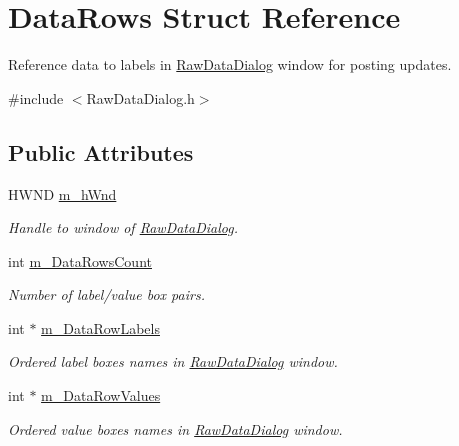 \hypertarget{struct_data_rows}{
\section{DataRows Struct Reference}
\label{struct_data_rows}
}


Reference data to labels in \hyperlink{class_raw_data_dialog}{RawDataDialog} window for posting updates.  




{\ttfamily \#include $<$RawDataDialog.h$>$}

\subsection*{Public Attributes}
\begin{DoxyCompactItemize}
\item 
\hypertarget{struct_data_rows_af3948dda47ada8528db37f5f97d0fd07}{
HWND \hyperlink{struct_data_rows_af3948dda47ada8528db37f5f97d0fd07}{m\_\-hWnd}}
\label{struct_data_rows_af3948dda47ada8528db37f5f97d0fd07}

\begin{DoxyCompactList}\small\item\em Handle to window of \hyperlink{class_raw_data_dialog}{RawDataDialog}. \end{DoxyCompactList}\item 
\hypertarget{struct_data_rows_a792b724c0572db986a6667b360a6676b}{
int \hyperlink{struct_data_rows_a792b724c0572db986a6667b360a6676b}{m\_\-DataRowsCount}}
\label{struct_data_rows_a792b724c0572db986a6667b360a6676b}

\begin{DoxyCompactList}\small\item\em Number of label/value box pairs. \end{DoxyCompactList}\item 
\hypertarget{struct_data_rows_ac5ce457a98f617913ad26bc9aed3de68}{
int $\ast$ \hyperlink{struct_data_rows_ac5ce457a98f617913ad26bc9aed3de68}{m\_\-DataRowLabels}}
\label{struct_data_rows_ac5ce457a98f617913ad26bc9aed3de68}

\begin{DoxyCompactList}\small\item\em Ordered label boxes names in \hyperlink{class_raw_data_dialog}{RawDataDialog} window. \end{DoxyCompactList}\item 
\hypertarget{struct_data_rows_a75d87af9a4cffed8ab995a909ed09088}{
int $\ast$ \hyperlink{struct_data_rows_a75d87af9a4cffed8ab995a909ed09088}{m\_\-DataRowValues}}
\label{struct_data_rows_a75d87af9a4cffed8ab995a909ed09088}

\begin{DoxyCompactList}\small\item\em Ordered value boxes names in \hyperlink{class_raw_data_dialog}{RawDataDialog} window. \end{DoxyCompactList}\end{DoxyCompactItemize}


